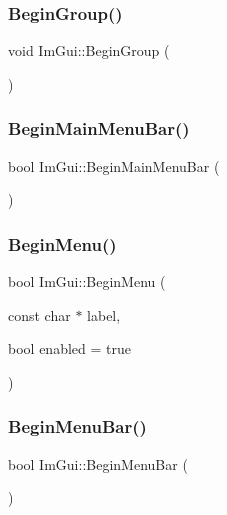 \hypertarget{namespace_im_gui_a42407e196b7ed2a8755bff28aae9805f}{}\label{namespace_im_gui_a42407e196b7ed2a8755bff28aae9805f} 
\subsubsection{\texorpdfstring{Begin\+Group()}{BeginGroup()}}
{\footnotesize\ttfamily void Im\+Gui\+::\+Begin\+Group (\begin{DoxyParamCaption}{ }\end{DoxyParamCaption})}

\hypertarget{namespace_im_gui_a55cb9cfb9865204ac6fb21c965784f78}{}\label{namespace_im_gui_a55cb9cfb9865204ac6fb21c965784f78} 
\subsubsection{\texorpdfstring{Begin\+Main\+Menu\+Bar()}{BeginMainMenuBar()}}
{\footnotesize\ttfamily bool Im\+Gui\+::\+Begin\+Main\+Menu\+Bar (\begin{DoxyParamCaption}{ }\end{DoxyParamCaption})}

\hypertarget{namespace_im_gui_a1e55711a21f97d5dff919d697d3a7201}{}\label{namespace_im_gui_a1e55711a21f97d5dff919d697d3a7201} 
\subsubsection{\texorpdfstring{Begin\+Menu()}{BeginMenu()}}
{\footnotesize\ttfamily bool Im\+Gui\+::\+Begin\+Menu (\begin{DoxyParamCaption}\item[{const char $\ast$}]{label,  }\item[{bool}]{enabled = {\ttfamily true} }\end{DoxyParamCaption})}

\hypertarget{namespace_im_gui_a4852dff802922163fc747e2e0df5b88f}{}\label{namespace_im_gui_a4852dff802922163fc747e2e0df5b88f} 
\subsubsection{\texorpdfstring{Begin\+Menu\+Bar()}{BeginMenuBar()}}
{\footnotesize\ttfamily bool Im\+Gui\+::\+Begin\+Menu\+Bar (\begin{DoxyParamCaption}{ }\end{DoxyParamCaption})}

